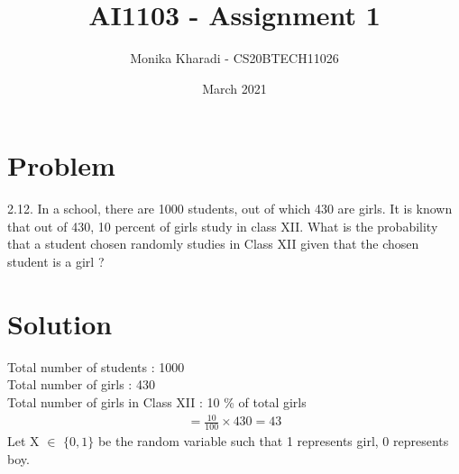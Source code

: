 \documentclass[journal,12pt,two column]{IEEEtran}
\title{AI1103 - Assignment 1}
\author{Monika Kharadi - CS20BTECH11026}
\date{March 2021}
\begin{document}
\maketitle
\section*{\large\textbf{Problem}}

2.12. In a school, there are 1000 students, out of which 430 are girls. It is known that out of 430, 10 percent of girls study in class XII. What is the probability that a student chosen randomly studies in Class XII given that the chosen student is a girl ?
{\section*{\large\textbf{Solution}}}
Total number of students : 1000 \\
Total number of girls : 430  \\
Total number of girls in Class XII : 10 \% of total girls 
\begin{align}
=\frac{10}{100}\times 430 =43
\end{align}
Let X $\in$ $\{0,1\}$ be the random variable such that 1 represents girl, 0 represents boy.
\end{document}
